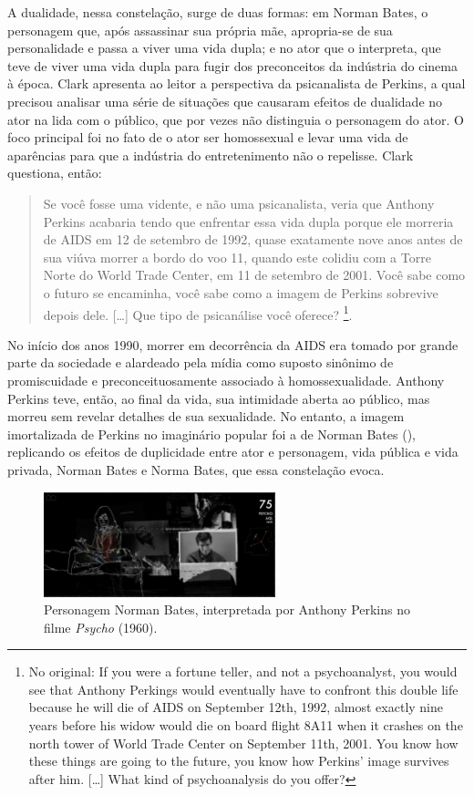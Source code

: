 \documentclass[portuguese]{textolivre}
\begin{document}
A dualidade, nessa constelação, surge de duas formas: em Norman Bates, o personagem que, após assassinar sua própria mãe, apropria-se de sua personalidade e passa a viver uma vida dupla; e no ator que o interpreta, que teve de viver uma vida dupla para fugir dos preconceitos da indústria do cinema à época. Clark apresenta ao leitor a perspectiva da psicanalista de Perkins, a qual precisou analisar uma série de situações que causaram efeitos de dualidade no ator na lida com o público, que por vezes não distinguia o personagem do ator. O foco principal foi no fato de o ator ser homossexual e levar uma vida de aparências para que a indústria do entretenimento não o repelisse. Clark questiona, então: 

\begin{quote}
Se você fosse uma vidente, e não uma psicanalista, veria que Anthony Perkins acabaria tendo que enfrentar essa vida dupla porque ele morreria de AIDS em 12 de setembro de 1992, quase exatamente nove anos antes de sua viúva morrer a bordo do voo 11, quando este colidiu com a Torre Norte do World Trade Center, em 11 de setembro de 2001. Você sabe como o futuro se encaminha, você sabe como a imagem de Perkins sobrevive depois dele. […] Que tipo de psicanálise você oferece? \cite[n. p., tradução nossa]{clark2010}\footnote{No original: If you were a fortune teller, and not a psychoanalyst, you would see that Anthony Perkings would eventually have to confront this double life because he will die of AIDS on September 12th, 1992, almost exactly nine years before his widow would die on board flight 8A11 when it crashes on the north tower of World Trade Center on September 11th, 2001. You know how these things are going to the future, you know how Perkins’ image survives after him. […] What kind of psychoanalysis do you offer?}.
\end{quote}

No início dos anos 1990, morrer em decorrência da AIDS era tomado por grande parte da sociedade e alardeado pela mídia como suposto sinônimo de promiscuidade e preconceituosamente associado à homossexualidade. Anthony Perkins teve, então, ao final da vida, sua intimidade aberta ao público, mas morreu sem revelar detalhes de sua sexualidade. No entanto, a imagem imortalizada de Perkins no imaginário popular foi a de Norman Bates (), replicando os efeitos de duplicidade entre ator e personagem, vida pública e vida privada, Norman Bates e Norma Bates, que essa constelação evoca. 

\begin{figure}[htbp]
 \centering
 \includegraphics[width=0.6\textwidth]{Fig9[1].jpg}
 \caption{Personagem Norman Bates, interpretada por Anthony Perkins no filme \emph{Psycho} (1960).}
 \label{fig9}
\end{figure}
\end{document}
